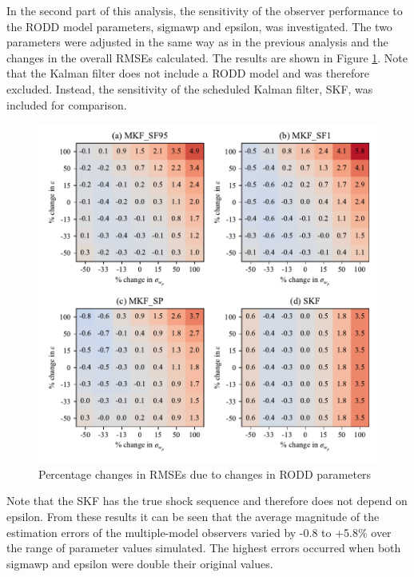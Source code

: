 In the second part of this analysis, the sensitivity of the observer performance to the \gls{RODD} model parameters, \gls{sigmawp} and \gls{epsilon}, was investigated. The two parameters were adjusted in the same way as in the previous analysis and the changes in the overall \gls{RMSE}s calculated. The results are shown in Figure \ref{fig:grind1-obs-sim-sens-rod-y-est}. Note that the Kalman filter does not include a RODD model and was therefore excluded. Instead, the sensitivity of the scheduled Kalman filter, SKF, was included for comparison.
\begin{figure}[htp]
	\centering
	\includegraphics[width=15cm]{images/rod_obs_sim_sens_rod_4obs_RMSE_y_est.pdf}
	\caption{Percentage changes in RMSEs due to changes in \gls{RODD} parameters}
	\label{fig:grind1-obs-sim-sens-rod-y-est}
\end{figure}
Note that the SKF has the true shock sequence and therefore does not depend on \gls{epsilon}. From these results it can be seen that the average magnitude of the estimation errors of the multiple-model observers varied by -0.8 to +5.8\% over the range of parameter values simulated. The highest errors occurred when both \gls{sigmawp} and \gls{epsilon} were double their original values.


